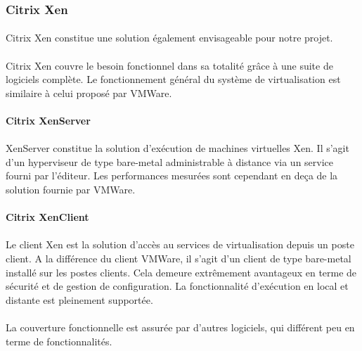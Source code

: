 \subsubsection{Citrix Xen}

\paragraph{} Citrix Xen constitue une solution également envisageable pour notre
projet.

\paragraph{} Citrix Xen couvre le besoin fonctionnel dans sa totalité grâce à
une suite de logiciels complète. Le fonctionnement général du système de
virtualisation est similaire à celui proposé par VMWare.

\paragraph{Citrix XenServer}

\paragraph{} XenServer constitue la solution d'exécution de machines virtuelles
Xen. Il s'agit d'un hyperviseur de type bare-metal administrable à distance via
un service fourni par l'éditeur. Les performances mesurées sont cependant en
deça de la solution fournie par VMWare.

\paragraph{Citrix XenClient}

\paragraph{} Le client Xen est la solution d'accès au services de virtualisation
depuis un poste client. A la différence du client VMWare, il s'agit d'un client
de type bare-metal installé sur les postes clients. Cela demeure extrêmement
avantageux en terme de sécurité et de gestion de configuration. La
fonctionnalité d'exécution en local et distante est pleinement supportée.

\paragraph{} La couverture fonctionnelle est assurée par d'autres logiciels, qui
différent peu en terme de fonctionnalités.

